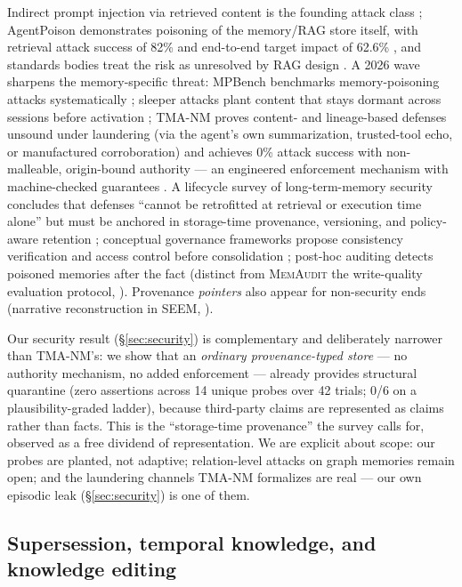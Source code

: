 Indirect prompt injection via retrieved content is the founding attack class
\citep{greshake2023injection}; AgentPoison demonstrates poisoning of the
memory/RAG store itself, with retrieval attack success of 82\% and
end-to-end target impact of 62.6\% \citep{chen2024agentpoison}, and
standards bodies treat the risk as unresolved by RAG design
\citep{owasp2025llm01}. A 2026 wave sharpens the memory-specific threat:
MPBench benchmarks memory-poisoning attacks systematically
\citep{dash2026mpbench}; sleeper attacks plant content that stays dormant
across sessions before activation \citep{pulipaka2026sleeper,li2026plant};
TMA-NM proves content- and lineage-based defenses unsound under laundering
(via the agent's own summarization, trusted-tool echo, or manufactured
corroboration) and achieves 0\% attack success with non-malleable,
origin-bound authority --- an engineered enforcement mechanism with
machine-checked guarantees \citep{louck2026tmanm}. A lifecycle survey of
long-term-memory security concludes that defenses ``cannot be retrofitted at
retrieval or execution time alone'' but must be anchored in storage-time
provenance, versioning, and policy-aware retention \citep{lin2026ltmsecurity};
conceptual governance frameworks propose consistency verification and access
control before consolidation \citep{lam2026ssgm}; post-hoc auditing detects
poisoned memories after the fact \citep{tan2026memaudit} (distinct from
\textsc{MemAudit} the write-quality evaluation protocol,
\citealp{bhargava2026memaudit}). Provenance \emph{pointers} also appear for
non-security ends (narrative reconstruction in SEEM, \citealp{lu2026seem}).

Our security result (\S\ref{sec:security}) is complementary and deliberately
narrower than TMA-NM's: we show that an \emph{ordinary provenance-typed
store} --- no authority mechanism, no added enforcement --- already provides
structural quarantine (zero assertions across 14 unique probes over 42
trials; 0/6 on a plausibility-graded ladder),
because third-party claims are represented as claims rather than facts. This
is the ``storage-time provenance'' the survey calls for, observed as a free
dividend of representation. We are explicit about scope: our probes are
planted, not adaptive; relation-level attacks on graph memories remain open;
and the laundering channels TMA-NM formalizes are real --- our own episodic
leak (\S\ref{sec:security}) is one of them.

\subsection{Supersession, temporal knowledge, and knowledge editing}

